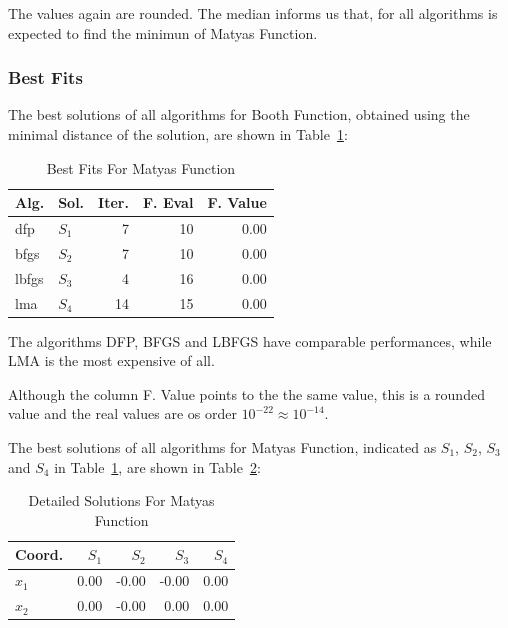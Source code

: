 \documentclass[conference]{IEEEtran}
\begin{document}
The values again are rounded. The median informs us that, for all
algorithms is expected to find the minimun of Matyas Function.
\subsubsection{Best Fits}
\label{bestfitsmatyas2D}


The best solutions of all algorithms for Booth Function, obtained using the minimal
distance of the solution, are shown in Table~\ref{solutions:matyas}:

\begin{table}[H]
\centering
\caption{Best Fits For Matyas Function}
\label{solutions:matyas}
\begin{tabular}{llrrr}
\toprule
 Alg. &    Sol. &  Iter. &  F. Eval &  F. Value \\
\midrule
  dfp & $S_{1}$ &      7 &       10 &      0.00 \\
 bfgs & $S_{2}$ &      7 &       10 &      0.00 \\
lbfgs & $S_{3}$ &      4 &       16 &      0.00 \\
  lma & $S_{4}$ &     14 &       15 &      0.00 \\
\bottomrule
\end{tabular}
\end{table}

The algorithms DFP, BFGS and LBFGS have comparable performances, while LMA
is the most expensive of all.

Although the column F. Value points to the the same value, this is a rounded value
and the real values are os order $10^{-22} \approx 10^{-14}$.



The best solutions of all algorithms for Matyas Function, indicated as
$S_{1}$, $S_{2}$, $S_{3}$ and $S_{4}$ in Table~\ref{solutions:matyas}, are shown
in Table~\ref{detailedsolutions:matyas}:

\begin{table}[H]
\centering
\caption{Detailed Solutions For Matyas Function}
\label{detailedsolutions:matyas}
\begin{tabular}{lrrrr}
\toprule
 Coord. &  $S_{1}$ &  $S_{2}$ &  $S_{3}$ &  $S_{4}$ \\
\midrule
$x_{1}$ &     0.00 &    -0.00 &    -0.00 &     0.00 \\
$x_{2}$ &     0.00 &    -0.00 &     0.00 &     0.00 \\
\bottomrule
\end{tabular}
\end{table}
\end{document}
